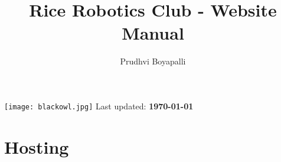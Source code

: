 \documentclass{article}
\begin{document}
    \pagestyle{fancy}
    \lhead{}
    \chead{}
    \rhead{}

    \title{Rice Robotics Club - Website Manual}
    \author{Prudhvi Boyapalli}

    \maketitle
    \begin{center}
        \vfill
        \texttt{[image: blackowl.jpg]}
        \vfill
        \large{Last updated: \textbf{\today}}
    \end{center}

    \newpage

    \section{Hosting}
    \label{sec:Hosting}
\end{document}
